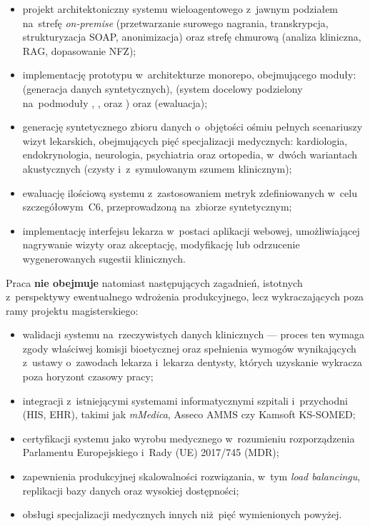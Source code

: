 \begin{itemize}[leftmargin=*, itemsep=2pt]
  \item projekt architektoniczny systemu wieloagentowego z~jawnym
        podziałem na~strefę \emph{on-premise} (przetwarzanie surowego
        nagrania, transkrypcja, strukturyzacja SOAP, anonimizacja)
        oraz strefę chmurową (analiza kliniczna, RAG, dopasowanie NFZ);
  \item implementację prototypu w~architekturze monorepo, obejmującego
        moduły:
         (generacja danych syntetycznych),
         (system docelowy podzielony na~podmoduły
        , ,  oraz
        ) oraz  (ewaluacja);
  \item generację syntetycznego zbioru danych o~objętości
        ośmiu pełnych scenariuszy wizyt lekarskich, obejmujących pięć
        specjalizacji medycznych: kardiologia, endokrynologia,
        neurologia, psychiatria oraz ortopedia, w~dwóch wariantach
        akustycznych (czysty i~z~symulowanym szumem klinicznym);
  \item ewaluację ilościową systemu z~zastosowaniem metryk
        zdefiniowanych w~celu szczegółowym~C6, przeprowadzoną
        na~zbiorze syntetycznym;
  \item implementację interfejsu lekarza w~postaci aplikacji webowej,
        umożliwiającej nagrywanie wizyty oraz akceptację, modyfikację
        lub odrzucenie wygenerowanych sugestii klinicznych.
\end{itemize}

Praca \textbf{nie obejmuje} natomiast następujących zagadnień,
istotnych z~perspektywy ewentualnego wdrożenia produkcyjnego, lecz
wykraczających poza ramy projektu magisterskiego:

\begin{itemize}[leftmargin=*, itemsep=2pt]
  \item walidacji systemu na~rzeczywistych danych klinicznych --- proces
        ten wymaga zgody właściwej komisji bioetycznej oraz spełnienia
        wymogów wynikających z~ustawy o~zawodach lekarza i~lekarza
        dentysty, których uzyskanie wykracza poza horyzont czasowy
        pracy;
  \item integracji z~istniejącymi systemami informatycznymi szpitali
        i~przychodni (HIS, EHR), takimi jak \emph{mMedica}, Asseco AMMS
        czy Kamsoft KS-SOMED;
  \item certyfikacji systemu jako wyrobu medycznego w~rozumieniu
        rozporządzenia Parlamentu Europejskiego i~Rady (UE) 2017/745
        (MDR);
  \item zapewnienia produkcyjnej skalowalności rozwiązania, w~tym
        \emph{load balancingu}, replikacji bazy danych oraz wysokiej
        dostępności;
  \item obsługi specjalizacji medycznych innych niż~pięć wymienionych
        powyżej.
\end{itemize}

